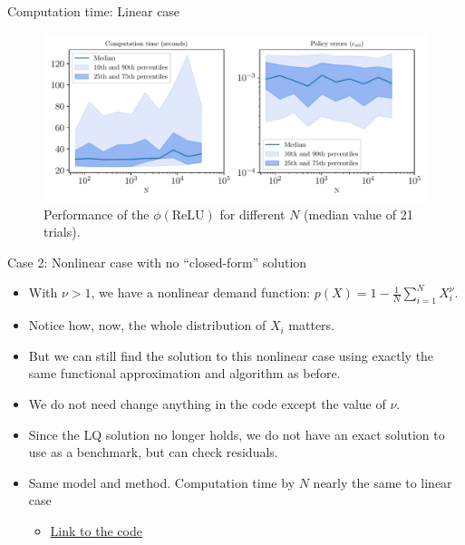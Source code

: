 \documentclass[aspectratio=169,10pt]{beamer}
\begin{document}
			\begin{frame}{Computation time: Linear case}
			
			\begin{figure}[h!]
			\centering
			\includegraphics[width=\linewidth]{./figures/deep-sets-linear-profiling-var-n}
			\caption{Performance of the $\phi(\text{ReLU})$ for different $N$ (median value of 21 trials).}
			\end{figure}	
			
			\end{frame}
				\begin{frame}{Case 2: Nonlinear case with no ``closed-form'' solution}
				
				\begin{itemize}
				
				\item With $\nu>1$, we have a nonlinear demand function:  $p(X) = 1 -  \frac{1}{N}\sum_{i=1}^N X_i^{\nu}$.\vspace{0.1in}
				
				\item Notice how, now, the whole distribution  of $X_i$ matters.\vspace{0.1in}
				
				\item But we can still find the solution to this nonlinear case using exactly the same functional approximation and algorithm as before.\vspace{0.1in}    
				
				\item We do not need change anything in the code except the value of $\nu$.\vspace{0.1in}   
				
				\item Since the LQ solution no longer holds, we do not have an exact solution to use as a benchmark, but can check residuals.\vspace{0.1in}
				
				\item Same model and method.  Computation time by $N$ nearly the same to linear case
			\begin{itemize}
				\item \href{https://github.com/HighDimensionalEconLab/symmetry_dynamic_programming/blob/main/demo_notebooks/investment_euler_demo.ipynb}{Link to the code}
			\end{itemize}
				\end{itemize}
				
				\end{frame}
	
\end{document}
